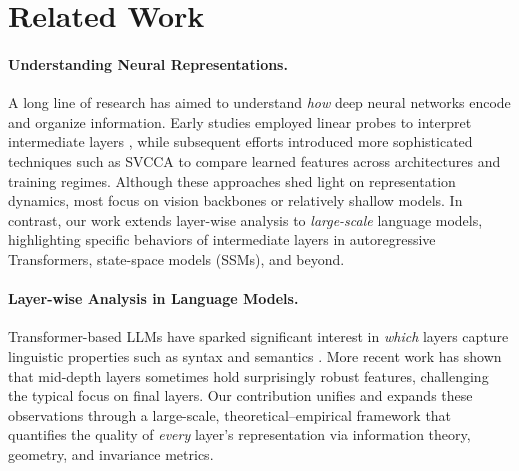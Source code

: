 \section{Related Work}
\label{sec:related}

\paragraph{Understanding Neural Representations.}


A long line of research has aimed to understand \emph{how} deep neural networks encode and organize information. Early studies employed linear probes to interpret intermediate layers \citep{alain2016understanding}, while subsequent efforts introduced more sophisticated techniques such as SVCCA \citep{raghu2017svcca} to compare learned features across architectures and training regimes. Although these approaches shed light on representation dynamics, most focus on vision backbones or relatively shallow models. In contrast, our work extends layer-wise analysis to \emph{large-scale} language models, highlighting specific behaviors of intermediate layers in autoregressive Transformers, state-space models (SSMs), and beyond.





\paragraph{Layer-wise Analysis in Language Models.}

Transformer-based LLMs have sparked significant interest in \emph{which} layers capture linguistic properties such as syntax and semantics \citep{liu2019linguistic, tenney2019bert, voita2019bottom}. More recent work \citep{jin2024conceptdepth, gurnee2023language, fan2024notalllayers} has shown that mid-depth layers sometimes hold surprisingly robust features, challenging the typical focus on final layers. Our contribution unifies and expands these observations through a large-scale, theoretical--empirical framework that quantifies the quality of \emph{every} layer’s representation via information theory, geometry, and invariance metrics.



